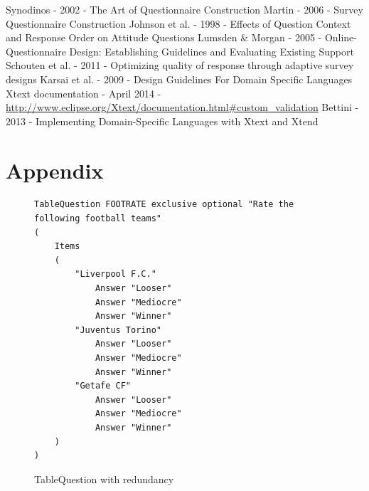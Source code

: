 \documentclass[runningheads,a4paper]{llncs}
\begin{document}
\begin{thebibliography}{4}

 Synodinos - 2002 - The Art of Questionnaire Construction
 Martin - 2006 - Survey Questionnaire Construction
 Johnson et al. - 1998 - Effects of Question Context and Response Order on Attitude Questions
 Lumsden \& Morgan - 2005 - Online-Questionnaire Design: Establishing Guidelines and Evaluating Existing Support
 Schouten et al. - 2011 - Optimizing quality of response through adaptive survey designs
 Karsai et al. - 2009 - Design Guidelines For Domain Specific Languages
 Xtext documentation - April 2014 - \url{http://www.eclipse.org/Xtext/documentation.html#custom_validation}
 Bettini - 2013 - Implementing Domain-Specific Languages with Xtext and Xtend

\end{thebibliography}
\newpage
\section*{Appendix}
\begin{figure}[htb]
\begin{lstlisting}[language=survey]
TableQuestion FOOTRATE exclusive optional "Rate the following football teams"
(
	Items 
	( 
		"Liverpool F.C."
			Answer "Looser"
			Answer "Mediocre"
			Answer "Winner"
		"Juventus Torino"
			Answer "Looser"
			Answer "Mediocre"
			Answer "Winner"
		"Getafe CF"
			Answer "Looser"
			Answer "Mediocre"
			Answer "Winner"
	)
)
\end{lstlisting}
\caption{TableQuestion with redundancy}
\label{fig:tablequestion_redundancy}
\end{figure}
\end{document}
